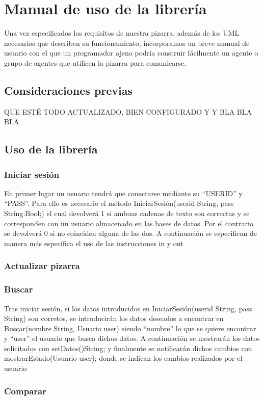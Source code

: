 \chapter{Manual de uso de la librería}
Una vez especificados los requisitos de nuestra pizarra, además de los UML necesarios que describen su funcionamiento, incorporamos un breve manual de usuario con el que un programador ajeno podría construir fácilmente un agente o grupo de agentes que utilicen la pizarra para comunicarse.

\section{Consideraciones previas}
\color{red}QUE ESTÉ TODO ACTUALIZADO, BIEN CONFIGURADO Y Y BLA BLA BLA
\color{black}
\section{Uso de la librería}
\subsection{Iniciar sesión}
En primer lugar un usuario tendrá que conectarse mediante su ``USERID'' y ``PASS''. Para ello es necesario el método IniciarSesión(userid String, pass String:Bool;) el cual devolverá 1 si amboas cadenas de texto son correctas y se corresponden con un usuario almacenado en las bases de datos. Por el contrario se devolverá 0 si no coinciden alguna de las dos.
A continuación se especifican de manera más específica el uso de las instrucciones in y out
\subsection{Actualizar pizarra}
\subsection{Buscar}
Tras iniciar sesión, si los datos introducidos en IniciarSesión(userid String, pass String) son corretos, se introducirán los datos deseados a encontrar en Buscar(nombre String, Usuario user) siendo ``nombre'' lo que se quiere encontrar y ``user'' el usuario que busca dichos datos. A continuación se mostrarán los datos solicitados con setDatos()String; y finalmente se notificarán dichos cambios con mostrarEstado(Usuario user); donde se indican los cambios realizados por el usuario
\subsection{Comparar}
